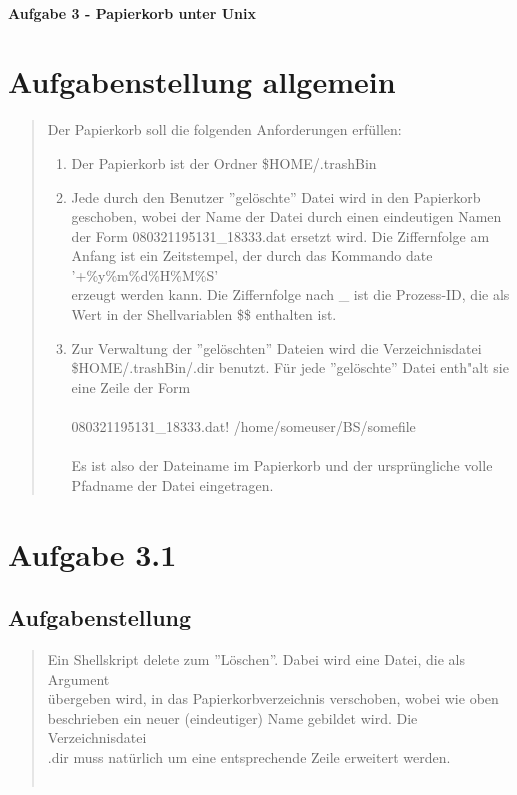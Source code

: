 \newpage

\paragraph{\LARGE Aufgabe 3 - Papierkorb unter Unix}
\section{Aufgabenstellung allgemein}
	\begin{quote}
		Der Papierkorb soll die folgenden Anforderungen erf\"ullen:
		\begin{enumerate}
			\item Der Papierkorb ist der Ordner \$HOME/.trashBin\\
			\item Jede durch den Benutzer ''gel\"oschte'' Datei wird in den Papierkorb\\
			geschoben, wobei der Name der Datei durch einen eindeutigen Namen\\ der Form 080321195131\_18333.dat ersetzt wird. Die Ziffernfolge am\\
			Anfang ist ein Zeitstempel, der durch das Kommando date '+\%y\%m\%d\%H\%M\%S'\\
			erzeugt werden kann. Die Ziffernfolge nach \_ ist die Prozess-ID, 	die als\\
			Wert in der Shellvariablen \$\$ enthalten ist.\\
			\item Zur Verwaltung der ''gel\"oschten'' Dateien wird die Verzeichnisdatei\\
			\$HOME/.trashBin/.dir benutzt. F\"ur jede ''gel\"oschte'' Datei enth"alt sie eine Zeile der Form\\ \\
			080321195131\_18333.dat! /home/someuser/BS/somefile\\ \\
			Es ist also der Dateiname im Papierkorb und der urspr\"ungliche volle Pfadname der Datei eingetragen.\\
		\end{enumerate}
	\end{quote}

\section{Aufgabe 3.1}
	\subsection{Aufgabenstellung}
		\begin{quote}
			Ein Shellskript delete zum ''L\"oschen''. Dabei wird eine Datei, die als Argument\\
			\"ubergeben wird, in das Papierkorbverzeichnis verschoben, wobei wie oben\\
			beschrieben ein neuer (eindeutiger) Name gebildet wird. Die Verzeichnisdatei\\
			.dir muss nat\"urlich um eine entsprechende Zeile erweitert werden.\\ \\
		\end{quote}
